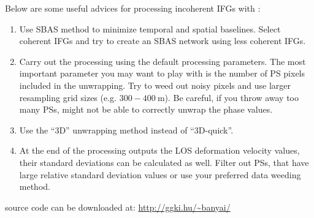 \documentclass[a0, portrait]{a0poster}
\begin{document}
\begin{multicols}{2}
\vspace{25pt}
Below are some useful advices for processing incoherent IFGs with \stamps:
\begin{enumerate}
    \item Use SBAS method to minimize temporal and spatial baselines. Select coherent IFGs and try to create an SBAS network using less coherent IFGs.
    \item Carry out the \stamps processing using the default processing parameters. The most important parameter you may want to play with is the number of PS pixels included in the unwrapping. Try to weed out noisy pixels and use larger resampling grid sizes (e.g. $\num{300}-\SI{400}{\meter}$). Be careful, if you throw away too many PSs, \stamps might not be able to correctly unwrap the phase values.
    \item Use the ``3D'' unwrapping method instead of ``3D-quick''.
    \item At the end of the processing \stamps outputs the LOS deformation velocity values, their standard deviations can be calculated as well. Filter out PSs, that have large relative standard deviation values or use your preferred data weeding method.
\end{enumerate}
\vspace{30pt}
{\color{blue} \large \daisy source code can be downloaded at: \url{http://ggki.hu/~banyai/}}

\normalfont



\end{multicols}
\end{document}
